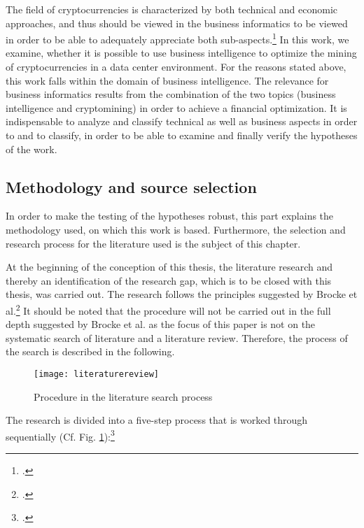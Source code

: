 The field of cryptocurrencies is characterized by both technical and economic approaches, and thus should be viewed in the business informatics
to be viewed in order to be able to adequately appreciate both sub-aspects.\footcite[Cf.][]{derks2018chaining} In this work, we examine,
whether it is possible to use business intelligence to optimize the mining of cryptocurrencies in a data center environment.
For the reasons stated above, this work falls within the domain of business intelligence. The relevance for
business informatics results from the combination of the two topics (business intelligence and cryptomining) in order to achieve a
financial optimization. It is indispensable to analyze and classify technical as well as business aspects in order to
and to classify, in order to be able to examine and finally verify the hypotheses of the work.

\subsection{Methodology and source selection} \label{toc:methodikundquellenauswahl}

In order to make the testing of the hypotheses robust, this part explains the methodology used, on which this work is based.
Furthermore, the selection and research process for the literature used is the subject of this chapter. 

At the beginning of the conception of this thesis, the literature research and thereby an identification of the research gap, which is to be closed with this thesis, was carried out.
The research follows the principles suggested by Brocke et al.\footcite[Cf.][]{brocke2009reconstructing}
It should be noted that the procedure will not be carried out in the full depth suggested by Brocke et al. as the
focus of this paper is not on the systematic search of literature and a literature review. Therefore, the process of the search is described in the following. 

\begin{figure}[H] 
    \caption{Procedure in the literature search process} 
    \texttt{[image: literaturereview]} 
    \label{figure:literaturereview} 
    \\ 
    \cite[Source: Based on][Fig. 3]{brocke2009reconstructing} 
\end{figure} 

The research is divided into a five-step process that is worked through sequentially
(Cf. Fig. \ref{figure:literaturereview}):\footcite[Cf.][pp. 2211]{brocke2009reconstructing} 

